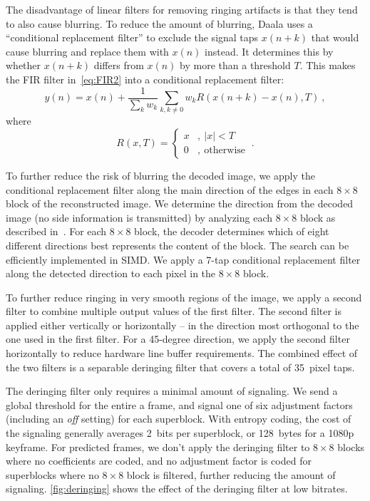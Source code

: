 \documentclass[english,conference,10pt]{IEEEtran}
\begin{document}
The disadvantage of linear filters for removing ringing artifacts
is that they tend to also cause blurring. To reduce the amount of
blurring, Daala uses a ``conditional replacement filter'' to exclude
the signal taps $x\left(n+k\right)$ that would cause blurring and
replace them with $x\left(n\right)$ instead. It determines this
by whether $x\left(n+k\right)$ differs from $x\left(n\right)$ by
more than a threshold $T$. This makes the FIR filter in~\cref{eq:FIR2}
into a conditional replacement filter:
\begin{equation}
y\left(n\right)=x\left(n\right)+\frac{1}{\sum_{k}w_{k}}\sum_{k,k\neq0}w_{k}R\left(x\left(n+k\right)-x\left(n\right),T\right)\ ,\label{eq:CRF}
\end{equation}
where
\begin{equation}
R\left(x,T\right)=\left\{ \begin{array}{ll}
x & ,\ \left|x\right|<T\\
0 & ,\ \mathrm{otherwise}
\end{array}\right.\ .
\end{equation}

To further reduce the risk of blurring the decoded image, we apply the
conditional replacement filter along the main direction of the edges
in each $8\times 8$ block of the reconstructed image. We determine the
direction from the decoded image (no side information is transmitted) by
analyzing each $8\times 8$ block as described
in~\cite{ValinDeringing}. For each $8\times 8$ block, the decoder determines which
of eight different directions best represents the content of the block.
The search can be efficiently implemented in SIMD\@. We
apply a 7-tap conditional replacement filter along the detected direction to
each pixel in the $8\times 8$ block.

To further reduce ringing in very smooth regions of the image, we apply a
second filter to combine multiple output values of the
first filter. The second filter is applied either vertically or horizontally
-- in the direction most orthogonal to the one used in the first filter.
For a 45-degree direction, we apply the second filter horizontally to reduce
hardware line buffer requirements. The combined effect of the two filters is a
separable deringing filter that covers a total of 35~pixel taps.

The deringing filter only requires a minimal amount of signaling. We send a
global threshold for the entire a frame, and signal one of six adjustment
factors (including an \textit{off} setting) for each superblock. With entropy coding, the
cost of the signaling generally averages 2~bits per superblock, or 128~bytes for
a 1080p keyframe. For predicted frames, we don't apply the deringing filter to
$8\times 8$ blocks where no coefficients are coded, and no adjustment factor
is coded for superblocks where no $8\times 8$ block is filtered, further
reducing the amount of signaling.
\cref{fig:deringing} shows the effect of the deringing filter at low bitrates.
\end{document}
